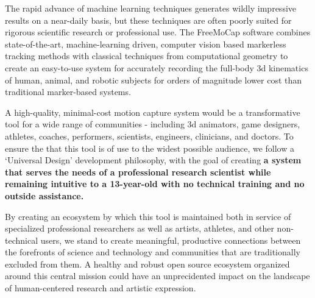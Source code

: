 
\noindent The rapid advance of machine learning techniques generates wildly impressive results on a near-daily basis, but these techniques are often poorly suited for rigorous scientific research or professional use. The FreeMoCap software combines state-of-the-art, machine-learning driven, computer vision based markerless tracking methods with classical techniques from computational geometry to create an easy-to-use system for accurately recording the full-body 3d kinematics of human, animal, and robotic subjects for orders of magnitude lower cost than traditional marker-based systems. 


A high-quality, minimal-cost motion capture system would be a transformative tool for a wide range of communities - including 3d animators, game designers, athletes, coaches, performers, scientists, engineers, clinicians, and doctors. To ensure the that this tool is of use to the widest possible audience, we follow a `Universal Design' development philosophy, with the goal of creating \textbf{a system that serves the needs of a professional research scientist while remaining intuitive to a 13-year-old with no technical training and no outside assistance.}

By creating an ecosystem by which this tool is maintained both in service of specialized professional researchers as well as artists, athletes, and other non-technical users, we stand to create meaningful, productive connections between the forefronts of science and technology and communities that are traditionally excluded from them. A healthy and robust open source ecosystem organized around this central mission could have an unprecidented impact on the landscape of human-centered research and artistic expression. 